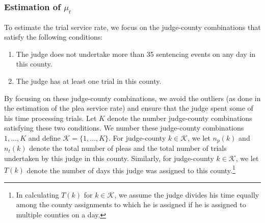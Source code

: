 \documentclass[11pt, oneside]{article}   	%
\theoremstyle{ModifiedStyle}
\begin{document}
		\subsubsection{Estimation of $\mu_t$}
			\label{mu_t-estimation}
			To estimate the trial service rate, we focus on the judge-county combinations that satisfy the following conditions:
			\begin{enumerate}[label=(\roman*)]
				\vspace{-2mm}
				\item The judge does not undertake more than 35 sentencing events on any day in this county.
				\item The judge has at least one trial in this county.
			\end{enumerate}
			\vspace{-1mm}
			By focusing on these judge-county combinations, we avoid the outliers (as done in the estimation of the plea service rate) and ensure that the judge spent some of his time processing trials. Let $K$ denote the number judge-county combinations satisfying these two conditions. We number these judge-county combinations $1,\ldots,K$ and define $\mathcal{K} = \{1,\ldots,K\}$. For judge-county $k \in \mathcal{K}$, we let $n_p(k)$ and $n_t(k)$ denote the total number of pleas and the total number of trials undertaken by this judge in this county. Similarly, for judge-county $k \in \mathcal{K}$, we let $T(k)$ denote the number of days this judge was assigned to this county.\footnote{In calculating $T(k)$ for $k\in\mathcal{K}$, we assume the judge divides his time equally among the county assignments to which he is assigned if he is assigned to multiple counties on a day.}
\end{document}
